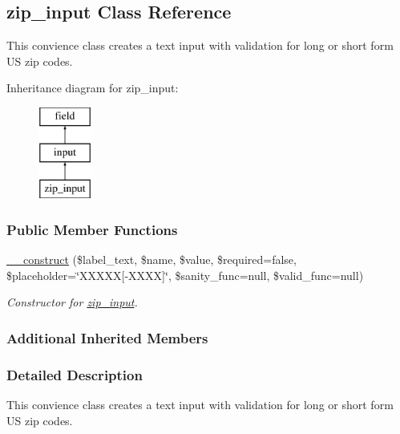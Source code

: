 \hypertarget{classzip__input}{\subsection{zip\-\_\-input Class Reference}
\label{classzip__input}
}


This convience class creates a text input with validation for long or short form U\-S zip codes.  


Inheritance diagram for zip\-\_\-input\-:\begin{figure}[H]
\begin{center}
\leavevmode
\includegraphics[height=3.000000cm]{classzip__input}
\end{center}
\end{figure}
\subsubsection*{Public Member Functions}
\begin{DoxyCompactItemize}
\item 
\hyperlink{classzip__input_a1e3ec25aa5cac0d6da454409efbceb9b}{\-\_\-\-\_\-construct} (\$label\-\_\-text, \$name, \$value, \$required=false, \$placeholder=\char`\"{}X\-X\-X\-X\-X\mbox{[}-\/X\-X\-X\-X\mbox{]}\char`\"{}, \$sanity\-\_\-func=null, \$valid\-\_\-func=null)
\begin{DoxyCompactList}\small\item\em Constructor for \hyperlink{classzip__input}{zip\-\_\-input}. \end{DoxyCompactList}\end{DoxyCompactItemize}
\subsubsection*{Additional Inherited Members}


\subsubsection{Detailed Description}
This convience class creates a text input with validation for long or short form U\-S zip codes. 

